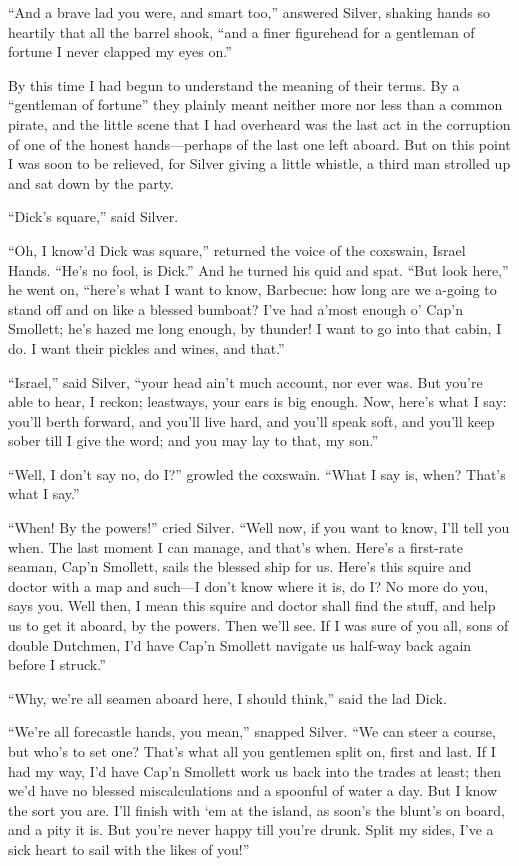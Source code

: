 \enquote{And a brave lad you were, and smart too,} answered Silver, shaking hands so heartily that all the barrel shook, \enquote{and a finer figurehead for a gentleman of fortune I never clapped my eyes on.}

By this time I had begun to understand the meaning of their terms. By a \enquote{gentleman of fortune} they plainly meant neither more nor less than a common pirate, and the little scene that I had overheard was the last act in the corruption of one of the honest hands---perhaps of the last one left aboard. But on this point I was soon to be relieved, for Silver giving a little whistle, a third man strolled up and sat down by the party.

\enquote{Dick’s square,} said Silver.

\enquote{Oh, I know’d Dick was square,} returned the voice of the coxswain, Israel Hands. \enquote{He’s no fool, is Dick.} And he turned his quid and spat. \enquote{But look here,} he went on, \enquote{here’s what I want to know, Barbecue: how long are we a-going to stand off and on like a blessed bumboat? I’ve had a’most enough o’ Cap’n Smollett; he’s hazed me long enough, by thunder! I want to go into that cabin, I do. I want their pickles and wines, and that.}

\enquote{Israel,} said Silver, \enquote{your head ain’t much account, nor ever was. But you’re able to hear, I reckon; leastways, your ears is big enough. Now, here’s what I say: you’ll berth forward, and you’ll live hard, and you’ll speak soft, and you’ll keep sober till I give the word; and you may lay to that, my son.}

\enquote{Well, I don’t say no, do I?} growled the coxswain. \enquote{What I say is, when? That’s what I say.}

\enquote{When! By the powers!} cried Silver. \enquote{Well now, if you want to know, I’ll tell you when. The last moment I can manage, and that’s when. Here’s a first-rate seaman, Cap’n Smollett, sails the blessed ship for us. Here’s this squire and doctor with a map and such---I don’t know where it is, do I? No more do you, says you. Well then, I mean this squire and doctor shall find the stuff, and help us to get it aboard, by the powers. Then we’ll see. If I was sure of you all, sons of double Dutchmen, I’d have Cap’n Smollett navigate us half-way back again before I struck.}

\enquote{Why, we’re all seamen aboard here, I should think,} said the lad Dick.

\enquote{We’re all forecastle hands, you mean,} snapped Silver. \enquote{We can steer a course, but who’s to set one? That’s what all you gentlemen split on, first and last. If I had my way, I’d have Cap’n Smollett work us back into the trades at least; then we’d have no blessed miscalculations and a spoonful of water a day. But I know the sort you are. I’ll finish with `em at the island, as soon’s the blunt’s on board, and a pity it is. But you’re never happy till you’re drunk. Split my sides, I’ve a sick heart to sail with the likes of you!}

